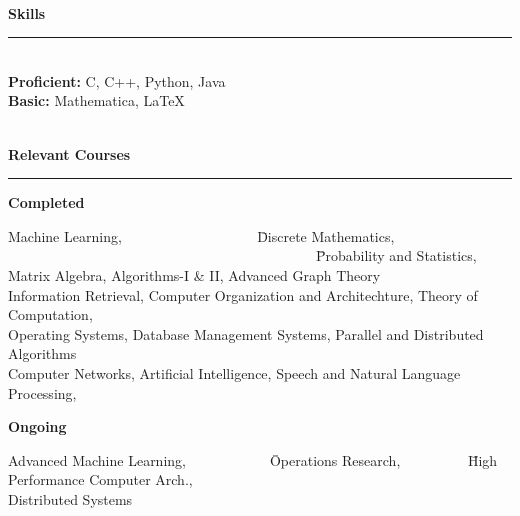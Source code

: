 \documentclass[a4paper,10pt,oneside]{article}
\newcommand{\heading}[1]{
 {\Large \textbf{#1}}
  \vspace{0.4em}
  \hrule
  \vspace{0.4em}
}
\newcommand{\SmallEntryGap}{ \vspace{0.6em} }
\newcommand{\EntryGap}{ ~\\ }
\begin{document}

\EntryGap
\heading{Skills}
\EntryGap
\textbf{Proficient:} C, C++, Python, Java\\
\textbf{Basic:} Mathematica, \LaTeX



\EntryGap
\heading{Relevant Courses}
\SmallEntryGap
\textbf{Completed}
\begin{tabbing}
Machine Learning, ~~~~~~~~~~~~~~~~~~ \= Discrete Mathematics, ~~~~~~~~~~~~~~~~~~~~~~~~~~~~~~~~~~~~~~~~~~~~\= Probability and Statistics,\\
Matrix Algebra, \> Algorithms-I \& II, \> Advanced Graph Theory\\
Information Retrieval, \> Computer Organization and Architechture, \> Theory of Computation,\\
Operating Systems, \> Database Management Systems, \> Parallel and Distributed Algorithms\\
Computer Networks,\> Artificial Intelligence, \> Speech and Natural Language Processing,
\end{tabbing}

\SmallEntryGap
\textbf{Ongoing}\\
\begin{tabbing}
Advanced Machine Learning,~~~~~~~~~~~~\= Operations Research, ~~~~~~~~~\=High Performance Computer Arch.,\\
Distributed Systems
\end{tabbing}
\end{document}
